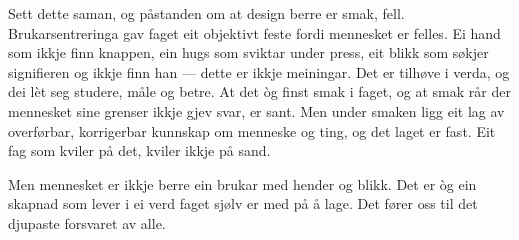 Sett dette saman, og påstanden om at design berre er smak, fell. Brukarsentreringa gav faget eit objektivt feste fordi mennesket er felles. Ei hand som ikkje finn knappen, ein hugs som sviktar under press, eit blikk som søkjer signifieren og ikkje finn han — dette er ikkje meiningar. Det er tilhøve i verda, og dei lèt seg studere, måle og betre. At det òg finst smak i faget, og at smak rår der mennesket sine grenser ikkje gjev svar, er sant. Men under smaken ligg eit lag av overførbar, korrigerbar kunnskap om menneske og ting, og det laget er fast. Eit fag som kviler på det, kviler ikkje på sand.

\vignett

Men mennesket er ikkje berre ein brukar med hender og blikk. Det er òg ein skapnad som lever i ei verd faget sjølv er med på å lage. Det fører oss til det djupaste forsvaret av alle.

